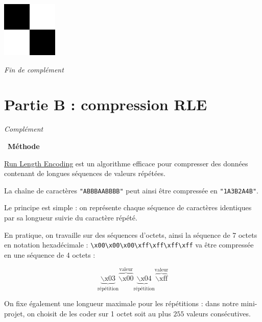 \documentclass[a4paper, french, 12pt]{article}  %
\newcounter{thme}
\newcounter{alg}
\newenvironment{methode}[1]
{\par \medskip    \noindent  
 \begin {bclogo}[arrondi =0.1,logo=\bcoutil, marge=4,noborder = true] {~\textbf{Méthode}   {\itshape #1} }  \par}
{
\end{bclogo}
 \par \bigskip }
\begin{document}
{\begin{minipage}{0.35\linewidth}
\begin{center}
\includegraphics[scale=1]{images/exemple2_binaire_2x2.png}
\end{center}
\end{minipage}

}

\begin{center}
\hfill \hrulefill \textit{Fin de complément} \hrulefill \hfill  \null
\end{center}



\section{Partie B : compression RLE}

\begin{center}
\hfill \hrulefill \textit{Complément} \hrulefill \hfill  \null
\end{center}
{\itshape

\begin{methode}{}
\href{https://fr.wikipedia.org/wiki/Run-length_encoding}{Run Length Encoding} est un algorithme efficace pour compresser des données contenant de longues séquences de valeurs répétées.

La chaîne de caractères \texttt{"ABBBAABBBB"} peut ainsi être compressée en \texttt{"1A3B2A4B"}.

Le principe est simple : on représente chaque séquence de caractères identiques par sa longueur suivie du caractère répété.

En pratique, on  travaille sur des séquences d'octets, ainsi la séquence de 7 octets en notation hexadécimale :
\verb+\x00\x00\x00\xff\xff\xff\xff+  va être compressée en une séquence de 4 octets :

\begin{equation*}
\underbrace{\backslash \text{x}03}_{\text{répétition}}\overbrace{\backslash \text{x}00}^{\text{valeur}}\underbrace{\backslash \text{x}04}_{\text{répétition}}\overbrace{\backslash \text{xff}}^{\text{valeur}}
\end{equation*}

On  fixe également une longueur maximale pour les répétitions : dans notre mini-projet, on choisit de les coder  sur 1 octet soit au plus $255$ valeurs consécutives.

\end{methode}
}
\end{document}
